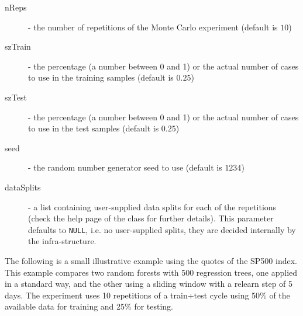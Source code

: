 \documentclass[10pt,a4paper]{article}\usepackage[]{graphicx}\usepackage[]{color}
\begin{document}
\begin{description}
\item[nReps] - the number of repetitions of the Monte Carlo experiment (default is $10$)
\item[szTrain] - the percentage (a number between 0 and 1) or the actual number of cases to use in the training samples (default is $0.25$)
\item[szTest] - the percentage (a number between 0 and 1) or the actual  number of cases to use in the test samples (default is $0.25$)
\item[seed] - the random number generator seed to use (default is $1234$)
\item[dataSplits] - a list containing user-supplied data splits
  for each of the repetitions (check the help page of the
  class for further details). This parameter defaults to
  \texttt{NULL}, i.e. no user-supplied splits, they are decided
  internally by the infra-structure.
\end{description}

The following is a small illustrative example using the quotes of the
SP500 index. This example compares two random forests with 500
regression trees, one applied in a standard way, and the other using
a sliding window with a relearn step of 5 days. The experiment
uses 10 repetitions of a train+test cycle using 50\% of the available
data for training and 25\% for testing.
\end{document}
